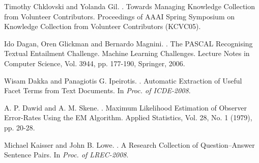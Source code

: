 \documentclass[11pt]{article}
\begin{document}
\begin{thebibliography}{}
Timothy Chklovski and Yolanda Gil.
.
\newblock Towards Managing Knowledge Collection from Volunteer Contributors.
\newblock Proceedings of AAAI Spring Symposium on Knowledge Collection from Volunteer Contributors (KCVC05).


Ido Dagan, Oren Glickman and Bernardo Magnini. 
.
\newblock The PASCAL Recognising Textual Entailment Challenge. 
\newblock Machine Learning Challenges. Lecture Notes in Computer Science, Vol. 3944, pp. 177-190, Springer, 2006.

Wisam Dakka and Panagiotis G. Ipeirotis.
.
\newblock Automatic Extraction of Useful Facet Terms from Text Documents.
\newblock In \textit{Proc. of ICDE-2008}.

A. P. Dawid and A. M. Skene.
.
\newblock Maximum Likelihood Estimation of Observer Error-Rates Using the EM Algorithm.
\newblock Applied Statistics, Vol. 28, No. 1 (1979), pp. 20-28.

%



Michael Kaisser and John B. Lowe. 
.
\newblock A Research Collection of Question–Answer Sentence Pairs.
\newblock In \textit{Proc. of LREC-2008}.


\end{thebibliography}
\end{document}
